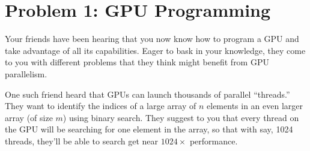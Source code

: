 \documentclass[11pt]{article}
\begin{document}
\section*{Problem 1: GPU Programming}

Your friends have been hearing that you now know how to program a GPU
and take advantage of all its capabilities. Eager to bask in your
knowledge, they come to you with different problems that they think
might benefit from GPU parallelism.

One such friend heard that GPUs can launch thousands of parallel
``threads.'' They want to identify the indices of a large array of
$n$ elements in an even larger array (of size $m$) using binary search. They suggest to
you that every thread on the GPU will be searching for one element in
the array, so that with say, 1024 threads, they'll be able to search
get near $1024\times$ performance.
\end{document}
